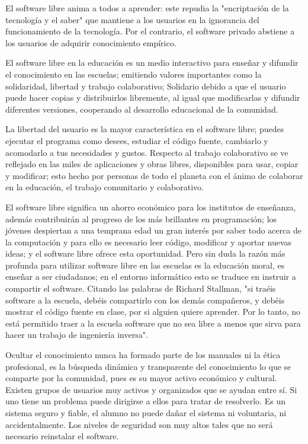 El software libre anima a todos a aprender: este repudia la
"encriptación de la tecnología y el saber" que mantiene a los
usuarios en la ignorancia del funcionamiento de la tecnología.
Por el contrario, el software privado abstiene a los usuarios de
adquirir conocimiento empírico.

El software libre en la educación es un medio interactivo para
enseñar y difundir el conocimiento en las escuelas; emitiendo
valores importantes como la solidaridad, libertad y trabajo
colaborativo; Solidario debido a que el usuario puede hacer
copias y distribuirlos libremente, al igual que modificarlas y
difundir diferentes versiones, cooperando al desarrollo
educacional de la comunidad.

La libertad del usuario es la mayor característica en el software
libre; puedes ejecutar el programa como desees, estudiar el
código fuente, cambiarlo y acomodarlo a tus necesidades y
gustos. Respecto al trabajo colaborativo se ve reflejado en las
miles de aplicaciones y obras libres, disponibles para usar,
copiar y modificar; esto hecho por personas de todo el planeta
con el ánimo de colaborar en la educación, el trabajo
comunitario y colaborativo.

El software libre significa un ahorro económico para los
institutos de enseñanza, además contribuirán al progreso de los
más brillantes en programación; los jóvenes despiertan a una
temprana edad un gran interés por saber todo acerca de la
computación y para ello es necesario leer código, modificar y
aportar nuevas ideas; y el software libre ofrece esta
oportunidad.
Pero sin duda la razón más profunda para utilizar software libre
en las escuelas es la educación moral, es enseñar a ser
ciudadanos; en el entorno informático esto se traduce en
instruir a compartir el software. 
Citando las palabras de Richard Stallman, "si traéis software a la escuela, debéis
compartirlo con los demás compañeros, y debéis mostrar el
código fuente en clase, por si alguien quiere aprender. Por lo
tanto, no está permitido traer a la escuela software que no sea
libre a menos que sirva para hacer un trabajo de ingeniería
inversa".

Ocultar el conocimiento nunca ha formado parte de los
manuales ni la ética profesional, es la búsqueda dinámica y
transparente del conocimiento lo que se comparte por la
comunidad, pues es su mayor activo económico y cultural.
Existen grupos de usuarios muy activos y organizados que se
ayudan entre sí. Si uno tiene un problema puede dirigirse a ellos
para tratar de resolverlo.
Es un sistema seguro y fiable, el alumno no puede dañar el
sistema ni voluntaria, ni accidentalmente. Los niveles de
seguridad son muy altos tales que no será necesario reinstalar el
software.

